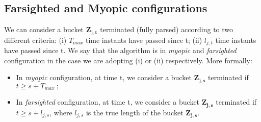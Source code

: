 \subsection{Farsighted and Myopic configurations}

We can consider a bucket $\boldsymbol{Z_{j,t}}$ terminated (fully parsed) according to two different criteria: (i) $T_{max}$ time instants have passed since t; (ii) $l_{j,t}$ time instants have passed since t. We say that the algorithm is in \emph{myopic} and \emph{farsighted} configuration in the case we are adopting (i) or (ii) respectively. More formally:
\begin{itemize}
	\item In \emph{myopic} configuration, at time t, we consider a bucket $\boldsymbol{Z_{j,s}}$ terminated if $t\geq s+T_{max} \ ;$
	\item In \emph{farsighted} configuration, at time t, we consider a bucket $\boldsymbol{Z_{j,s}}$ terminated if $t \geq s+l_{j,s}$, where $l_{j,s}$ is the true length of the bucket $\boldsymbol{Z_{j,s}}$.
	
\end{itemize}

%	
%	
%	


